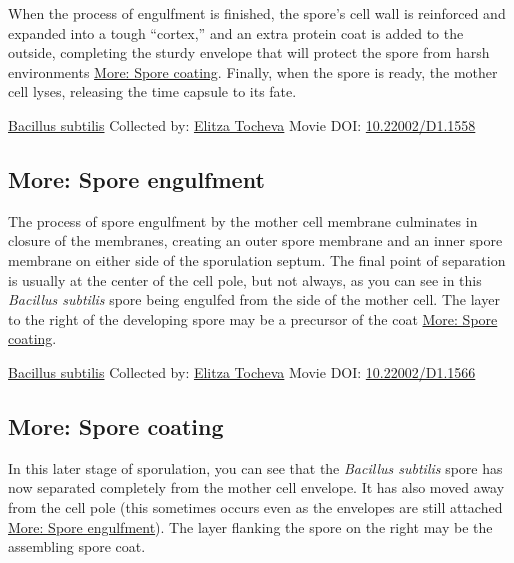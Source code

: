 \documentclass[]{tufte-book}
\begin{document}
When the process of engulfment is finished, the spore's cell wall is reinforced and expanded into a tough ``cortex,'' and an extra protein coat is added to the outside, completing the sturdy envelope that will protect the spore from harsh environments \protect\hyperlink{Spore_coating}{More: Spore coating}. Finally, when the spore is ready, the mother cell lyses, releasing the time capsule to its fate.



\hypertarget{htmlwidget-a52197de1dac5369c2ae}{}

\label{fig:8-6}\protect\hyperlink{tree}{Bacillus subtilis} Collected by: \protect\hyperlink{elitza_tocheva}{Elitza Tocheva} Movie DOI: \href{https://doi.org/10.22002/D1.1558}{10.22002/D1.1558}

\hypertarget{Spore_engulfment}{%
\subsection*{More: Spore engulfment}\label{Spore_engulfment}}

The process of spore engulfment by the mother cell membrane culminates in closure of the membranes, creating an outer spore membrane and an inner spore membrane on either side of the sporulation septum. The final point of separation is usually at the center of the cell pole, but not always, as you can see in this \emph{Bacillus subtilis} spore being engulfed from the side of the mother cell. The layer to the right of the developing spore may be a precursor of the coat \protect\hyperlink{Spore_coating}{More: Spore coating}.



\hypertarget{htmlwidget-70a6f62f01c301f0ac95}{}

\label{fig:8-6a}\protect\hyperlink{tree}{Bacillus subtilis} Collected by: \protect\hyperlink{elitza_tocheva}{Elitza Tocheva} Movie DOI: \href{https://doi.org/10.22002/D1.1566}{10.22002/D1.1566}

\hypertarget{Spore_coating}{%
\subsection*{More: Spore coating}\label{Spore_coating}}

In this later stage of sporulation, you can see that the \emph{Bacillus subtilis} spore has now separated completely from the mother cell envelope. It has also moved away from the cell pole (this sometimes occurs even as the envelopes are still attached \protect\hyperlink{Spore_engulfment}{More: Spore engulfment}). The layer flanking the spore on the right may be the assembling spore coat.
\end{document}
